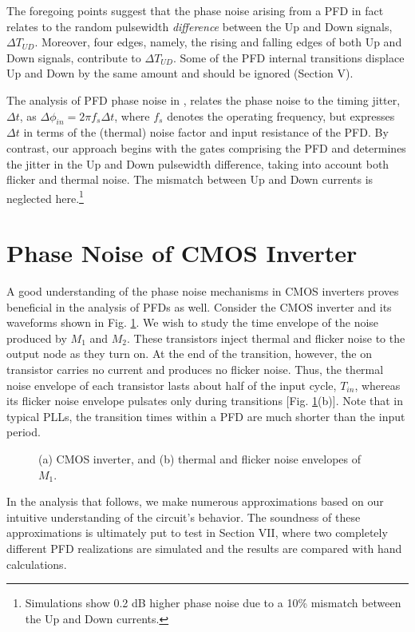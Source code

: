 The foregoing points suggest that the phase noise arising from a PFD in fact relates to the random pulsewidth {\em difference} between the Up and
Down signals, $\Delta T_{UD}$. Moreover, four edges, namely, the rising and falling edges of both Up and Down signals, contribute to $\Delta
T_{UD}$. Some of the PFD internal transitions displace Up and Down by the same amount and should be ignored (Section V). 

The analysis of PFD phase noise in \cite{Brennan}, \cite{Thompson} relates the phase noise to the timing jitter, $\Delta t$, as $\Delta \phi _{in} =
2 \pi f_s \Delta t$, where $f_s$ denotes the operating frequency, but expresses $\Delta t$ in terms of the (thermal) noise factor and input
resistance of the PFD.
By contrast, our approach begins with the gates comprising the PFD and determines the jitter in the Up and Down pulsewidth difference, taking into
account both flicker and thermal noise. {The mismatch between Up and Down currents is neglected here.}\footnote{Simulations show 0.2 dB
higher phase noise due to a 10\% mismatch between the Up and Down currents.}


\section{Phase Noise of CMOS Inverter}
A good understanding of the phase noise mechanisms in CMOS inverters proves beneficial in the analysis of PFDs as well. Consider the CMOS inverter
and its waveforms shown in Fig. \ref{noisepercycle}. We wish to study the time envelope of the noise produced by $M_1$ and $M_2$. These transistors inject
thermal and flicker noise to the output node as they turn on. At the end of the transition, however, the on transistor carries no current and
produces no flicker noise. Thus, the thermal noise envelope of each transistor lasts about half of the input cycle, $T_{in}$, whereas its flicker
noise envelope pulsates only during transitions [Fig. \ref{noisepercycle}(b)]. Note that in typical PLLs, the transition times within a PFD are much shorter than the input
period.
\begin{figure}[htb]
\vspace{2.8in}
\caption{(a) CMOS inverter, and (b) thermal and flicker noise envelopes of $M_1$.}
\label{noisepercycle}
\end{figure}

In the analysis that follows, we make numerous approximations based on our intuitive understanding of the circuit's behavior. The soundness of
these approximations is ultimately put to test in Section VII, where two completely different PFD realizations are simulated and the results are
compared with hand calculations.

